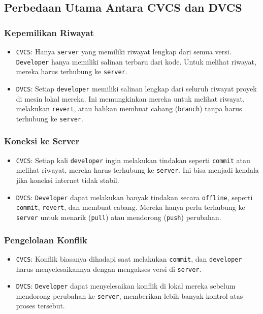 \documentclass{article}
\begin{document}
\subsection{Perbedaan Utama Antara CVCS dan DVCS}

\subsubsection{Kepemilikan Riwayat}
\begin{itemize}
    \item \texttt{CVCS}: Hanya \texttt{server} yang memiliki riwayat lengkap dari semua versi. \texttt{Developer} hanya memiliki salinan terbaru dari kode. Untuk melihat riwayat, mereka harus terhubung ke \texttt{server}.
    \item \texttt{DVCS}: Setiap \texttt{developer} memiliki salinan lengkap dari seluruh riwayat proyek di mesin lokal mereka. Ini memungkinkan mereka untuk melihat riwayat, melakukan \texttt{revert}, atau bahkan membuat cabang (\texttt{branch}) tanpa harus terhubung ke \texttt{server}.
\end{itemize}

\subsubsection{Koneksi ke Server}
\begin{itemize}
    \item \texttt{CVCS}: Setiap kali \texttt{developer} ingin melakukan tindakan seperti \texttt{commit} atau melihat riwayat, mereka harus terhubung ke \texttt{server}. Ini bisa menjadi kendala jika koneksi internet tidak stabil.
    \item \texttt{DVCS}: \texttt{Developer} dapat melakukan banyak tindakan secara \texttt{offline}, seperti \texttt{commit}, \texttt{revert}, dan membuat cabang. Mereka hanya perlu terhubung ke \texttt{server} untuk menarik (\texttt{pull}) atau mendorong (\texttt{push}) perubahan.
\end{itemize}

\subsubsection{Pengelolaan Konflik}
\begin{itemize}
    \item \texttt{CVCS}: Konflik biasanya dihadapi saat melakukan \texttt{commit}, dan \texttt{developer} harus menyelesaikannya dengan mengakses versi di \texttt{server}.
    \item \texttt{DVCS}: \texttt{Developer} dapat menyelesaikan konflik di lokal mereka sebelum mendorong perubahan ke \texttt{server}, memberikan lebih banyak kontrol atas proses tersebut.
\end{itemize}
\end{document}
